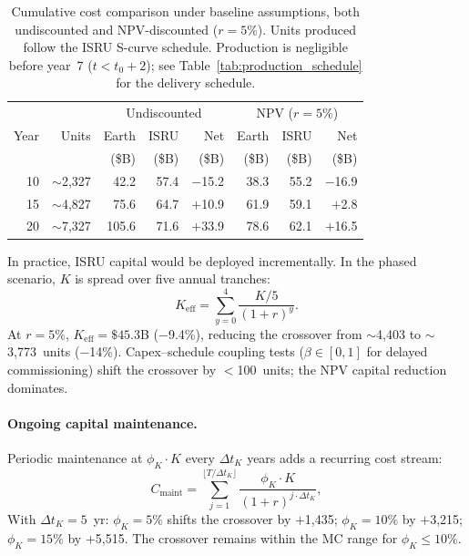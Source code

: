 \documentclass[preprint,12pt]{elsarticle}
\begin{document}
\begin{table}[htbp]
\centering
\caption{Cumulative cost comparison under baseline assumptions, both undiscounted and NPV-discounted ($r = 5\%$). Units produced follow the ISRU S-curve schedule. Production is negligible before year~7 ($t < t_0 + 2$); see Table~\ref{tab:production_schedule} for the delivery schedule.}
\label{tab:cumulative}
\begin{tabular}{@{}rr|rrr|rrr@{}}
\toprule
 & & \multicolumn{3}{c|}{Undiscounted} & \multicolumn{3}{c}{NPV ($r = 5\%$)} \\
Year & Units & Earth & ISRU & Net & Earth & ISRU & Net \\
 & & (\$B) & (\$B) & (\$B) & (\$B) & (\$B) & (\$B) \\
\midrule
10 & $\sim$2{,}327 & 42.2  & 57.4   & $-$15.2 & 38.3  & 55.2  & $-$16.9 \\
15 & $\sim$4{,}827 & 75.6  & 64.7   & $+$10.9 & 61.9  & 59.1  & $+$2.8  \\
20 & $\sim$7{,}327 & 105.6 & 71.6   & $+$33.9 & 78.6  & 62.1  & $+$16.5 \\
\bottomrule
\end{tabular}
\end{table}

In practice, ISRU capital would be deployed incrementally. In the phased scenario, $K$ is spread over five annual tranches:
\begin{equation}
  K_{\mathrm{eff}} = \sum_{y=0}^{4} \frac{K/5}{(1+r)^y}.
  \label{eq:phased_capital}
\end{equation}
At $r = 5\%$, $K_{\mathrm{eff}} = \$45.3$B ($-$9.4\%), reducing the crossover from $\sim$4{,}403 to $\sim$3{,}773~units ($-$14\%). Capex--schedule coupling tests ($\beta \in [0, 1]$ for delayed commissioning) shift the crossover by $<$100~units; the NPV capital reduction dominates.

\paragraph{Ongoing capital maintenance.} Periodic maintenance at $\phi_K \cdot K$ every $\Delta t_K$ years adds a recurring cost stream:
\begin{equation}
  C_{\mathrm{maint}} = \sum_{j=1}^{\lfloor T/\Delta t_K \rfloor} \frac{\phi_K \cdot K}{(1+r)^{j \cdot \Delta t_K}},
\end{equation}
With $\Delta t_K = 5$~yr: $\phi_K = 5\%$ shifts the crossover by $+$1{,}435; $\phi_K = 10\%$ by $+$3{,}215; $\phi_K = 15\%$ by $+$5{,}515. The crossover remains within the MC range for $\phi_K \leq 10\%$.
\end{document}
